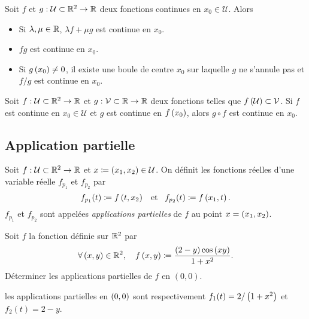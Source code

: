 \documentclass{magnolia}
\begin{document}
\begin{proposition}
Soit $f$ et $g:\mathcal{U}\subset\mathbb{R}^2\to\mathbb{R}$ deux fonctions continues en $x_0\in\mathcal{U}$.  Alors
\begin{itemize}
\item Si $\lambda,\mu\in\mathbb{R}$, $\lambda f+\mu g$ est continue en $x_0$.
\item $fg$ est continue en $x_0$.
\item Si $g\left(x_0\right)\neq 0$, il existe une boule de centre $x_0$ sur
  laquelle $g$ ne s'annule pas et $f/g$ est continue en $x_0$.
\end{itemize}
\end{proposition}


\begin{proposition}
Soit $f:\mathcal{U}\subset\mathbb{R}^2\to\mathbb{R}$ et $g:\mathcal{V}\subset\mathbb{R}\to\mathbb{R}$ deux fonctions
telles que $f\left(\mathcal{U}\right)\subset\mathcal{V}$. Si
$f$ est continue en $x_0\in\mathcal{U}$ et $g$ est continue en $f\left(x_0\right)$, alors $g\circ f$
est continue en $x_0$.
\end{proposition}

\subsection{Application partielle}

\begin{definition}
Soit $f:\mathcal{U}\subset\mathbb{R}^2\to\mathbb{R}$ et $x\coloneqq\left(x_1,x_2\right)\in\mathcal{U}$. On
définit les fonctions réelles d'une variable réelle $f_{p_1}$ et $f_{p_2}$ par
\[f_{p_1}(t)\coloneqq f\left(t,x_2\right) \quad\!\text{et}\quad\! f_{p_2}(t)\coloneqq f\left(x_1,t\right).\]
$f_{p_1}$ et $f_{p_2}$ sont appelées \emph{applications partielles} de $f$ au point
$x=\left(x_1,x_2\right)$.
\end{definition}

\begin{exoUnique}
\exemple Soit $f$ la fonction définie sur $\mathbb{R}^2$ par
  \[\forall\left(x,y\right)\in\mathbb{R}^2 ,\quad f\left(x,y\right)\coloneqq\frac{\left(2-y\right)\cos\left(xy\right)}{1+x^2}.\]
  Déterminer les applications partielles de $f$ en $(0,0)$.
  \begin{sol}
  les applications partielles en $\left(0,0\right)$ sont respectivement
  $f_1(t)=2/\left(1+x^2\right)$ et $f_2(t)=2-y$.    
  \end{sol}
\end{exoUnique}
\end{document}
